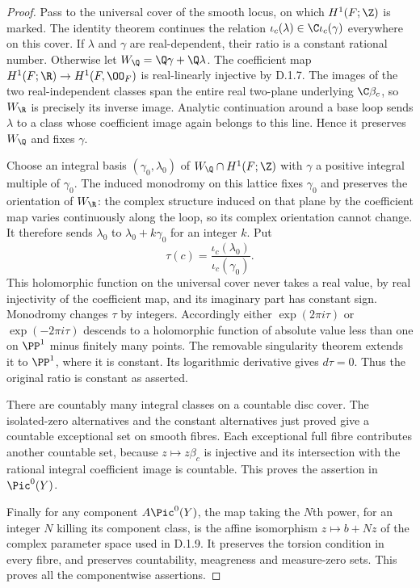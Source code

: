 \begin{proof}
Pass to the universal cover of the smooth locus, on which
$H^1(F;\Z)$ is marked. The identity theorem continues the relation
$\iota_c(\lambda)\in\C\iota_c(\gamma)$ everywhere on this cover.
If $\lambda$ and $\gamma$ are real-dependent, their ratio is a
constant rational number. Otherwise let
$W_{\Q}=\Q\gamma+\Q\lambda$. The coefficient map
$H^1(F;\R)\to H^1(F,\OO_F)$ is real-linearly injective by D.1.7.
The images of the two real-independent classes span the entire
real two-plane underlying $\C\beta_c$, so $W_{\R}$ is precisely
its inverse image. Analytic continuation around a base loop
sends $\lambda$ to a class whose coefficient image again belongs
to this line. Hence it preserves $W_{\Q}$ and fixes $\gamma$.

Choose an integral basis $(\gamma_0,\lambda_0)$ of
$W_{\Q}\cap H^1(F;\Z)$ with $\gamma$ a positive integral multiple
of $\gamma_0$. The induced monodromy on this lattice fixes
$\gamma_0$ and preserves the orientation of $W_{\R}$: the complex
structure induced on that plane by the coefficient map varies
continuously along the loop, so its complex orientation cannot change.
It therefore sends $\lambda_0$ to $\lambda_0+k\gamma_0$ for an
integer $k$. Put
\[
\tau(c)=\frac{\iota_c(\lambda_0)}{\iota_c(\gamma_0)}.
\]
This holomorphic function on the universal cover never takes a
real value, by real injectivity of the coefficient map, and its
imaginary part has constant sign. Monodromy changes $\tau$ by
integers. Accordingly either $\exp(2\pi i\tau)$ or
$\exp(-2\pi i\tau)$ descends to a holomorphic function of absolute
value less than one on $\PP^1$ minus finitely many points. The
removable singularity theorem extends it to $\PP^1$, where it is
constant. Its logarithmic derivative gives $d\tau=0$. Thus the
original ratio is constant as asserted.

There are countably many integral classes on a countable disc
cover. The isolated-zero alternatives and the constant alternatives
just proved give a countable exceptional set on smooth fibres.
Each exceptional full fibre contributes another countable set,
because $z\mapsto z\beta_c$ is injective and its intersection with
the rational integral coefficient image is countable. This proves
the assertion in $\Pic^0(Y)$.

Finally for any component $A\Pic^0(Y)$, the map taking the $N$th
power, for an integer $N$ killing its component class, is the affine
isomorphism $z\mapsto b+Nz$ of the complex parameter space used
in D.1.9. It preserves the torsion condition in every fibre, and
preserves countability, meagreness and measure-zero sets. This
proves all the componentwise assertions.
\end{proof}

